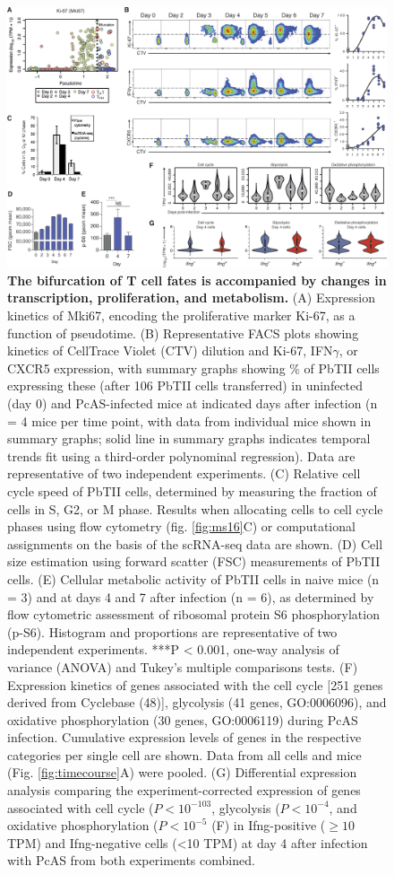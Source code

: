 \begin{figure}
    \centering
    \includegraphics[width=\textwidth]{"Fig4"}
    \caption[The bifurcation of T cell fates is accompanied by changes in transcription, proliferation, and metabolism]{\textbf{The bifurcation of T cell fates is accompanied by changes in transcription, proliferation, and metabolism.} (A) Expression kinetics of Mki67, encoding the proliferative marker Ki-67, as a function of pseudotime. (B) Representative FACS plots showing kinetics of CellTrace Violet (CTV) dilution and Ki-67, IFN\( \gamma \), or CXCR5 expression, with summary graphs showing \% of PbTII cells expressing these (after 106 PbTII cells transferred) in uninfected (day 0) and PcAS-infected mice at indicated days after infection (n = 4 mice per time point, with data from individual mice shown in summary graphs; solid line in summary graphs indicates temporal trends fit using a third-order polynominal regression). Data are representative of two independent experiments. (C) Relative cell cycle speed of PbTII cells, determined by measuring the fraction of cells in S, G2, or M phase. Results when allocating cells to cell cycle phases using flow cytometry (fig. \ref{fig:ms16}C) or computational assignments on the basis of the scRNA-seq data are shown. (D) Cell size estimation using forward scatter (FSC) measurements of PbTII cells. (E) Cellular metabolic activity of PbTII cells in naive mice (n = 3) and at days 4 and 7 after infection (n = 6), as determined by flow cytometric assessment of ribosomal protein S6 phosphorylation (p-S6). Histogram and proportions are representative of two independent experiments. ***P < 0.001, one-way analysis of variance (ANOVA) and Tukey’s multiple comparisons tests. (F) Expression kinetics of genes associated with the cell cycle [251 genes derived from Cyclebase (48)], glycolysis (41 genes, GO:0006096), and oxidative phosphorylation (30 genes, GO:0006119) during PcAS infection. Cumulative expression levels of genes in the respective categories per single cell are shown. Data from all cells and mice (Fig. \ref{fig:timecourse}A) were pooled. (G) Differential expression analysis comparing the experiment-corrected expression of genes associated with cell cycle (\( P < 10^{-103} \), glycolysis (\( P < 10^{-4} \), and oxidative phosphorylation (\( P < 10^{-5} \) (F) in Ifng-positive (\( \geq 10 \) TPM) and Ifng-negative cells (<10 TPM) at day 4 after infection with PcAS from both experiments combined.}

\end{figure}
